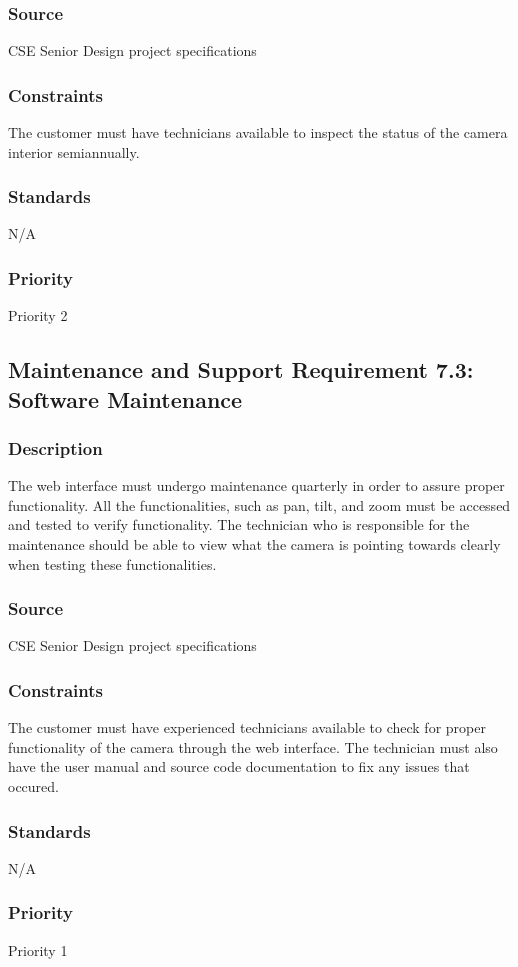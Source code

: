 \subsubsection{Source}
CSE Senior Design project specifications
\subsubsection{Constraints}
The customer must have technicians available to inspect the status of the camera interior semiannually. 
\subsubsection{Standards}
N/A
\subsubsection{Priority}
Priority 2

\subsection{Maintenance and Support Requirement 7.3: Software Maintenance}
\subsubsection{Description}
The web interface must undergo maintenance quarterly in order to assure proper functionality. All the functionalities, such as pan, tilt, and zoom must be accessed and tested to verify functionality. The technician who is responsible for the maintenance should be able to view what the camera is pointing towards clearly when testing these functionalities. 
\subsubsection{Source}
CSE Senior Design project specifications
\subsubsection{Constraints}
The customer must have experienced technicians available to check for proper functionality of the camera through the web interface. The technician must also have the user manual and source code documentation to fix any issues that occured. 
\subsubsection{Standards}
N/A
\subsubsection{Priority}
Priority 1
